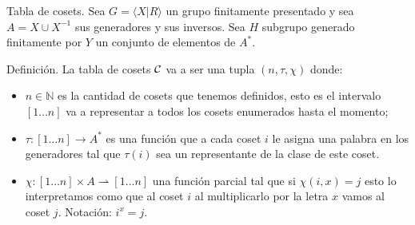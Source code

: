 \documentclass[aspectratio=169, 9pt]{beamer}
\newcommand{\fp}{finitamente presentado }
\newcommand{\In}{[1 \dots n]}
\newcommand{\Co}{{\cal{C}}}
\begin{document}

\begin{frame}[fragile]{Tabla de cosets.}
	Sea $G = \langle X | R \rangle$ un grupo \fp y sea $A = X \cup X^{-1}$ sus generadores y sus inversos.
	Sea $H$ subgrupo generado finitamente por $Y$ un conjunto de elementos de $A^*$.
	\pause
	\begin{alertblock}{Definición.}
		La tabla de cosets $\Co $ va a ser una tupla $(n, \tau, \chi)$ donde:
		\pause
		\begin{itemize}
			\item $n \in  \mathbb{N}$ es la cantidad de cosets que tenemos definidos, esto es el intervalo $\In$ va a representar a todos los cosets enumerados hasta el momento;
			\pause
			\item $\tau : \In \to A^*$ es una función que a cada coset $i$ le asigna una palabra en los generadores tal que $\tau(i)$ sea un representante de la clase de este coset.
			\pause
			\item $\chi: \In \times A \rightharpoonup \In$ una función parcial tal que si $\chi(i, x) = j$ esto lo interpretamos como que al coset $i$ al multiplicarlo por la letra $x$ vamos al coset $j$.
			\pause
			Notación: $i^x = j$.
		\end{itemize}
		
		
		
	\end{alertblock}
	
	
\end{frame}
\end{document}
